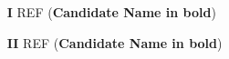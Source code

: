 %
\begin{enumerate}
%

\item[\textbf{I}]  REF (\textbf{Candidate Name in bold})
\smallskip


\item[\textbf{II}] REF (\textbf{Candidate Name in bold})
\smallskip










\end{enumerate}